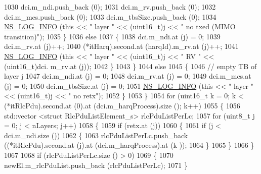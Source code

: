 \begin{DoxyCode}
1030                       dci.m\_ndi.push\_back (0);
1031                       dci.m\_rv.push\_back (0);
1032                       dci.m\_mcs.push\_back (0);
1033                       dci.m\_tbsSize.push\_back (0);
1034                       \hyperlink{group__logging_gafbd73ee2cf9f26b319f49086d8e860fb}{NS\_LOG\_INFO} (\textcolor{keyword}{this} << \textcolor{stringliteral}{" layer "} << (uint16\_t)j << \textcolor{stringliteral}{" no txed (MIMO
       transition)"});
1035                     \}
1036                   \textcolor{keywordflow}{else}
1037                     \{
1038                       dci.m\_ndi.at (j) = 0;
1039                       dci.m\_rv.at (j)++;
1040                       (*itHarq).second.at (harqId).m\_rv.at (j)++;
1041                       \hyperlink{group__logging_gafbd73ee2cf9f26b319f49086d8e860fb}{NS\_LOG\_INFO} (\textcolor{keyword}{this} << \textcolor{stringliteral}{" layer "} << (uint16\_t)j << \textcolor{stringliteral}{" RV "} << (uint16\_t)dci.
      m\_rv.at (j));
1042                     \}
1043                 \}
1044               \textcolor{keywordflow}{else}
1045                 \{
1046                   \textcolor{comment}{// empty TB of layer j}
1047                   dci.m\_ndi.at (j) = 0;
1048                   dci.m\_rv.at (j) = 0;
1049                   dci.m\_mcs.at (j) = 0;
1050                   dci.m\_tbsSize.at (j) = 0;
1051                   \hyperlink{group__logging_gafbd73ee2cf9f26b319f49086d8e860fb}{NS\_LOG\_INFO} (\textcolor{keyword}{this} << \textcolor{stringliteral}{" layer "} << (uint16\_t)j << \textcolor{stringliteral}{" no retx"});
1052                 \}
1053             \}
1054           \textcolor{keywordflow}{for} (uint16\_t k = 0; k < (*itRlcPdu).second.at (0).at (dci.m\_harqProcess).size (); k++)
1055             \{
1056               std::vector <struct RlcPduListElement\_s> rlcPduListPerLc;
1057               \textcolor{keywordflow}{for} (uint8\_t j = 0; j < nLayers; j++)
1058                 \{
1059                   \textcolor{keywordflow}{if} (retx.at (j))
1060                     \{
1061                       \textcolor{keywordflow}{if} (j < dci.m\_ndi.size ())
1062                         \{
1063                           rlcPduListPerLc.push\_back ((*itRlcPdu).second.at (j).at (dci.m\_harqProcess).at (k
      ));
1064                         \}
1065                     \}
1066                 \}
1067 
1068               \textcolor{keywordflow}{if} (rlcPduListPerLc.size () > 0)
1069                 \{
1070                   newEl.m\_rlcPduList.push\_back (rlcPduListPerLc);
1071                 \}

\end{DoxyCode}
